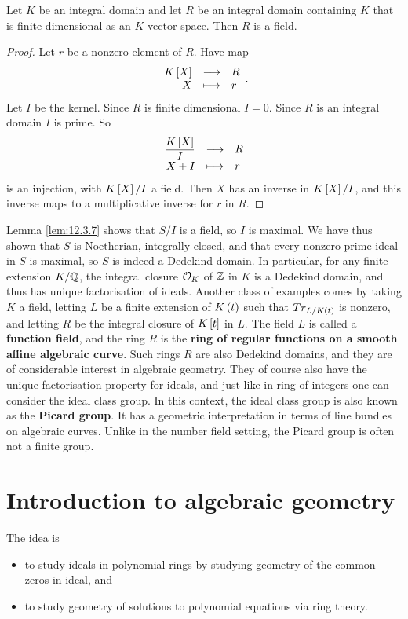 \begin{lemma}
\label{lem:12.3.7}
Let $ K $ be an integral domain and let $ R $ be an integral domain containing $ K $ that is finite dimensional as an $ K $-vector space. Then $ R $ is a field.
\end{lemma}

\begin{proof}
Let $ r $ be a nonzero element of $ R $. Have map
$$ \function{K\sbr{X}}{R}{X}{r}. $$
Let $ I $ be the kernel. Since $ R $ is finite dimensional $ I = 0 $. Since $ R $ is an integral domain $ I $ is prime. So
$$ \function{\dfrac{K\sbr{X}}{I}}{R}{X + I}{r} $$
is an injection, with $ K\sbr{X} / I $ a field. Then $ X $ has an inverse in $ K\sbr{X} / I $, and this inverse maps to a multiplicative inverse for $ r $ in $ R $.
\end{proof}

Lemma \ref{lem:12.3.7} shows that $ S / I $ is a field, so $ I $ is maximal. We have thus shown that $ S $ is Noetherian, integrally closed, and that every nonzero prime ideal in $ S $ is maximal, so $ S $ is indeed a Dedekind domain. In particular, for any finite extension $ K / \mathbb{Q} $, the integral closure $ \mathcal{O}_K $ of $ \mathbb{Z} $ in $ K $ is a Dedekind domain, and thus has unique factorisation of ideals. Another class of examples comes by taking $ K $ a field, letting $ L $ be a finite extension of $ K\br{t} $ such that $ Tr_{L / K\br{t}} $ is nonzero, and letting $ R $ be the integral closure of $ K\sbr{t} $ in $ L $. The field $ L $ is called a \textbf{function field}, and the ring $ R $ is the \textbf{ring of regular functions on a smooth affine algebraic curve}. Such rings $ R $ are also Dedekind domains, and they are of considerable interest in algebraic geometry. They of course also have the unique factorisation property for ideals, and just like in ring of integers one can consider the ideal class group. In this context, the ideal class group is also known as the \textbf{Picard group}. It has a geometric interpretation in terms of line bundles on algebraic curves. Unlike in the number field setting, the Picard group is often not a finite group.

\pagebreak

\section{Introduction to algebraic geometry}


The idea is
\begin{itemize}
\item to study ideals in polynomial rings by studying geometry of the common zeros in ideal, and
\item to study geometry of solutions to polynomial equations via ring theory.
\end{itemize}

